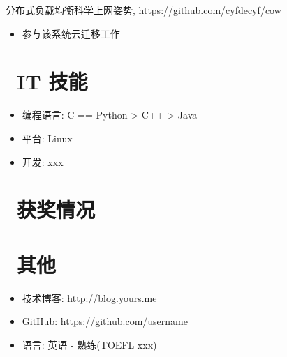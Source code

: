 \documentclass{resume}
\begin{document}
    \begin{onehalfspacing}
    分布式负载均衡科学上网姿势, https://github.com/cyfdecyf/cow
    \begin{itemize}
    \item 参与该系统云迁移工作
    \end{itemize}
    \end{onehalfspacing}


    \section{\faCogs\ IT 技能}
    \begin{itemize}[parsep=0.5ex]
    \item 编程语言: C == Python > C++ > Java
    \item 平台: Linux
    \item 开发: xxx
    \end{itemize}

    \section{\faHeartO\ 获奖情况}

    \section{\faInfo\ 其他}
    \begin{itemize}[parsep=0.5ex]
    \item 技术博客: http://blog.yours.me
    \item GitHub: https://github.com/username
    \item 语言: 英语 - 熟练(TOEFL xxx)
    \end{itemize}

    
\end{document}
